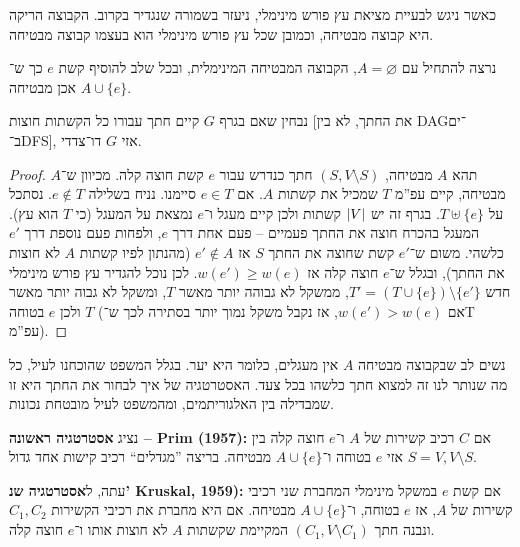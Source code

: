 \documentclass[]{../../../../tex/classes/styledArticle}
\begin{document}
	כאשר ניגש לבעיית מציאת עץ פורש מינימלי, ניעזר בשמורה שנגדיר בקרוב. 
	הקבוצה הריקה היא קבוצה מבטיחה, וכמובן שכל עץ פורש מינימלי הוא בעצמו קבוצה מבטיחה. 
	
	נרצה להתחיל עם $A = \varnothing$, הקבוצה המבטיחה המינימלית, ובכל שלב להוסיף קשת $e$ כך ש־$A \cup \{e\}$ אכן מבטיחה. 
	
	נבחין שאם בגרף $G$ קיים חתך עבורו כל הקשתות חוצות [את החתך, לא בין DAG־ים ב־DFS], אזי $G$ דו־צדדי. 
	\begin{proof}
		תהא $A$ מבטיחה, $(S, V \setminus S)$ חתך כנדרש עבור $e$ קשת חוצה קלה. מכיוון ש־$A$ מבטיחה, קיים עפ''מ $T$ שמכיל את קשתות $A$. אם $e \in T$ סיימנו. נניח בשלילה $e \notin T$. נסתכל על $T \uplus \{e\}$. בגרף זה יש $\left \lvert V \right \rvert$ קשתות ולכן קיים מעגל ו־$e$ נמצאת על המעגל (כי $T$ הוא עץ). המעגל בהכרח חוצה את החתך פעמיים – פעם אחת דרך $e$, ולפחות פעם נוספת דרך $e'$ כלשהי. משום ש־$e'$ קשת שחוצה את החתך $S$ אז $e' \notin A$ (מהנתון לפיו קשתות $A$ לא חוצות את החתך), ובגלל ש־$e$ חוצה קלה אז $w(e') \ge w(e)$. לכן נוכל להגדיר עץ פורש מינימלי חדש $T' = (T \cup \{e\}) \setminus \{e'\}$, ממשקל לא גבוהה יותר מאשר $T$, ומשקל לא גבוה יותר מאשר $T$ ולכן $e$ בטוחה (אם $w(e') > w(e)$, אז נקבל משקל נמוך יותר בסתירה לכך ש־T עפ''מ). 
	\end{proof}
	נשים לב שבקבוצה מבטיחה $A$ אין מעגלים, כלומר היא יער. בגלל המשפט שהוכחנו לעיל, כל מה שנותר לנו זה למצוא חתך כלשהו בכל צעד. האסטרטגיה של איך לבחור את החתך היא זו שמבדילה בין האלגוריתמים, ומהמשפט לעיל מובטחת נכונות. 
	
	נציג \textbf{אסטרטגיה ראשונה – Prim (1957):} אם $C$ רכיב קשירות של $A$ ו־$e$ חוצה קלה בין $S = V, V \setminus S$ אזי $e$ בטוחה ו־$A \cup \{e\}$ מבטיחה. בריצה ''מגדלים`` רכיב קישות אחד גדול. 
	
	עתה, ל\textbf{אסטרטגיה שנ' Kruskal, 1959): }אם קשת $e$ במשקל מינימלי המחברת שני רכיבי קשירות של $A$, אז $e$ בטוחה, ו־$A \cup \{e\}$ מבטיחה. אם היא מחברת את רכיבי הקשירות $C_1, C_2$ ונבנה חתך $(C_1, V \setminus C_1)$ המקיימת שקשתות $A$ לא חוצות אותו ו־$e$ חוצה קלה. 
	
\end{document}
